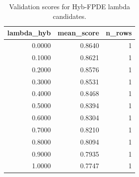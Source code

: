 \begin{table}[t]
\caption{Validation scores for Hyb-FPDE lambda candidates.}
\label{tab:lambda_distribution_computed}
\centering
\begin{tabular}{rrr}
\toprule
lambda\_hyb & mean\_score & n\_rows \\
\midrule
0.0000 & 0.8640 & 1 \\
0.1000 & 0.8621 & 1 \\
0.2000 & 0.8576 & 1 \\
0.3000 & 0.8531 & 1 \\
0.4000 & 0.8468 & 1 \\
0.5000 & 0.8394 & 1 \\
0.6000 & 0.8304 & 1 \\
0.7000 & 0.8210 & 1 \\
0.8000 & 0.8094 & 1 \\
0.9000 & 0.7935 & 1 \\
1.0000 & 0.7747 & 1 \\
\bottomrule
\end{tabular}

\end{table}
